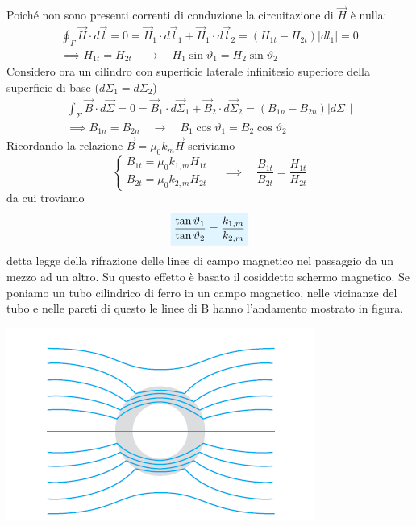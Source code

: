 \documentclass[x11names]{report}
\begin{document}
Poiché non sono presenti correnti di conduzione la circuitazione di \(\vec{H}\) è nulla:
\begin{gather*}
	\oint_\Gamma \vec{H} \cdot d\vec{l} = 0 = \vec{H}_1 \cdot d\vec{l}_1 + \vec{H}_1 \cdot d\vec{l}_2 = (H_{1t} - H_{2t})|dl_1| = 0 \\
	\implies H_{1t} = H_{2t} \quad \to \quad H_1\sin\vartheta_1 = H_2\sin\vartheta_2
\end{gather*}
Considero ora un cilindro con superficie laterale infinitesio superiore della superficie di base (\(d\Sigma_1 = d\Sigma_2\))
\begin{gather*}
	\int_\Sigma \vec{B} \cdot d\vec{\Sigma} = 0 = \vec{B}_1 \cdot d\vec{\Sigma}_1 + \vec{B}_2 \cdot d\vec{\Sigma}_2 = (B_{1n} - B_{2n}) |d\Sigma_1| \\
	\implies B_{1n} = B_{2n} \quad \to \quad B_1\cos\vartheta_1 = B_2\cos\vartheta_2
\end{gather*}
Ricordando la relazione \(\vec{B} = \mu_0 k_m \vec{H}\) scriviamo
\[
\begin{cases}
	B_{1t} = \mu_0 k_{1,m} H_{1t} \\
	B_{2t} = \mu_0 k_{2,m} H_{2t}
\end{cases} \quad \implies \quad
\frac{B_{1t}}{B_{2t}} = \frac{H_{1t}}{H_{2t}}
\]
da cui troviamo
\begin{equation}
	\viola{\frac{\tan\vartheta_1}{\tan\vartheta_2} = \frac{k_{1,m}}{k_{2,m}}}
\end{equation}
detta legge della rifrazione delle linee di campo magnetico nel passaggio da un mezzo ad un altro. Su questo effetto è basato il cosiddetto schermo magnetico. Se poniamo un tubo cilindrico di ferro in un campo magnetico, nelle vicinanze del tubo e nelle pareti di questo le linee di B hanno l’andamento mostrato in figura.
\begin{center}
	\includegraphics[scale=0.5]{img/schermo.png}
\end{center}
\end{document}
